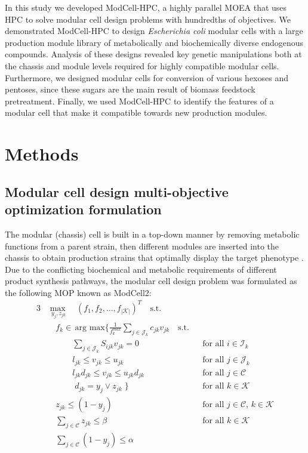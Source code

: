 \documentclass[12pt]{article}
\begin{document}
In this study we developed ModCell-HPC, a highly parallel MOEA that uses HPC to solve modular cell design problems with hundredths of objectives.
We demonstrated ModCell-HPC to design \textit{Escherichia coli} modular cells with a large production module library of metabolically and biochemically diverse endogenous compounds.
Analysis of these designs revealed key genetic manipulations both at the chassis and module levels required for highly compatible modular cells.
Furthermore, we designed modular cells for conversion of various hexoses and pentoses, since these sugars are the main result of biomass feedstock pretreatment.\citep{brodeur2011}
Finally, we used ModCell-HPC to identify the features of a modular cell that make it compatible towards new production modules. %

\section{Methods}

\subsection{Modular cell design multi-objective optimization formulation} \label{sec:formulation}

The modular (chassis) cell is built in a top-down manner by removing metabolic functions from a parent strain, then different modules are inserted into the chassis to obtain production strains that optimally display the target phenotype .
Due to the conflicting biochemical and metabolic requirements of different product synthesis pathways, the modular cell design problem was formulated as the following MOP known as ModCell2:\citep{garcia2019}
\begin{alignat}{3}
    & \underset{ \; y_j, z_{jk}}{\max} \quad (f_1, f_2, \ldots, f_{|\mathcal{K}|})^T \quad \text{s.t.}  \label{eq7:of1} \\
    &  \quad f_k \in \, \text{arg }\underset{}{\text{max}} \Bigg\{ \frac{1}{f_k^{max}}\sum_{j \in \mathcal{J}_k} c_{jk}  v_{jk} \quad \text{s.t.} \label{eq7:of2}\\
    & \quad \qquad \sum_{j\in \mathcal{J}_k}S_{ijk}v_{jk} = 0 && \text{for all } i \in \mathcal{I}_k  \label{eq7:mb}\\
    & \quad \qquad  l_{jk} \le v_{jk} \le u_{jk}  && \text{for all } j \in \mathcal{J}_k \label{eq7:rb}\\
    & \quad \qquad  l_{jk} d_{jk} \le v_{jk} \le u_{jk} d_{jk} && \text{for all } j \in \mathcal{C} \label{eq7:db}\\
    & \quad \qquad \; d_{jk} = y_j \lor z_{jk} \; \Bigg\} && \text{for all } k \in \mathcal{K} \label{eq7:defdjk} \\
    & \quad z_{jk}\le (1-y_j) && \text{for all } j \in \mathcal{C}, \, k \in \mathcal{K} \label{eq7:mr1}\\
    & \quad \sum_{j \in \mathcal{C}}z_{jk} \le \beta && \text{for all } k \in \mathcal{K} \label{eq7:mr2} \\
    & \quad \sum_{j \in \mathcal{C}} (1-y_j) \le \alpha \label{eq7:a}
\end{alignat}
\end{document}
